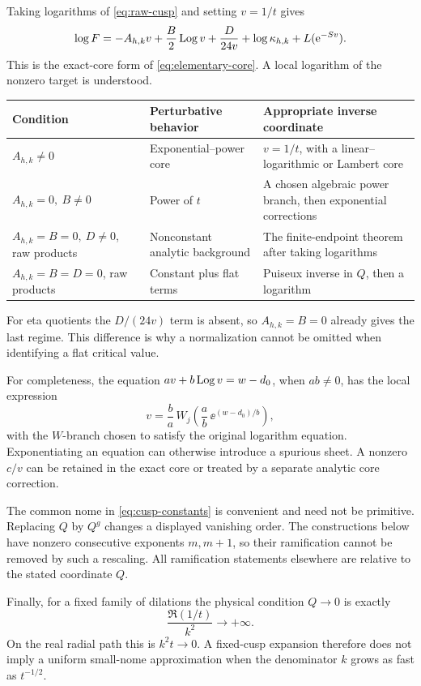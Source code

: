 Taking logarithms of \cref{eq:raw-cusp} and setting \(v=1/t\)
gives
\begin{equation}\label{eq:log-core-cusp}
 \log F=
 -A_{h,k}v+\frac B2\operatorname{Log} v+\frac{D}{24v}
 +\log\kappa_{h,k}+L(\mathrm e^{-Sv}).
\end{equation}
This is the exact-core form of \cref{eq:elementary-core}.
A local logarithm of the nonzero target is understood.

\begin{center}
\begin{tabularx}{\textwidth}{@{}>{\raggedright\arraybackslash}p{}>{\raggedright\arraybackslash}p{}>{\raggedright\arraybackslash}X@{}}
\toprule
Condition & Perturbative behavior & Appropriate inverse coordinate\\
\midrule
\(A_{h,k}\ne0\) &
Exponential--power core &
\(v=1/t\), with a linear--logarithmic or Lambert core\\
\(A_{h,k}=0,\ B\ne0\) &
Power of \(t\) &
A chosen algebraic power branch, then exponential corrections\\
\(A_{h,k}=B=0,\ D\ne0\), raw products &
Nonconstant analytic background &
The finite-endpoint theorem after taking logarithms\\
\(A_{h,k}=B=D=0\), raw products &
Constant plus flat terms &
Puiseux inverse in \(Q\), then a logarithm\\
\bottomrule
\end{tabularx}
\end{center}

For eta quotients the \(D/(24v)\) term is absent, so
\(A_{h,k}=B=0\) already gives the last regime.
This difference is why a normalization cannot be omitted when
identifying a flat critical value.

For completeness, the equation
\(av+b\operatorname{Log} v=w-d_0\), when \(ab\ne0\), has the local expression
\[
 v=\frac ba\,W_j\left(
       \frac ab\,\ee^{(w-d_0)/b}\right),
\]
with the \(W\)-branch chosen to satisfy the original logarithm
equation.  Exponentiating an equation can otherwise introduce a
spurious sheet.  A nonzero \(c/v\) can be retained in the exact
core or treated by a separate analytic core correction.

The common nome in \cref{eq:cusp-constants} is convenient and need
not be primitive.  Replacing \(Q\) by \(Q^g\) changes a displayed
vanishing order.  The constructions below have nonzero consecutive
exponents \(m,m+1\), so their ramification cannot be removed by
such a rescaling.  All ramification statements elsewhere are
relative to the stated coordinate \(Q\).

Finally, for a fixed family of dilations the physical condition
\(Q\to0\) is exactly
\[
 \frac{\Re(1/t)}{k^2}\longrightarrow+\infty.
\]
On the real radial path this is \(k^2t\to0\).
A fixed-cusp expansion therefore does not imply a uniform
small-nome approximation when the denominator \(k\) grows as fast
as \(t^{-1/2}\).
